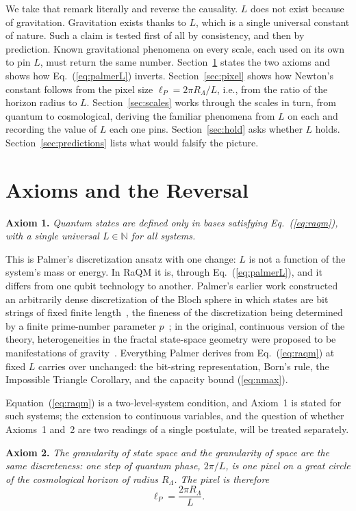 \documentclass[aps,prd,twocolumn,superscriptaddress,nofootinbib,showkeys]{revtex4-2}
\begin{document}
We take that remark literally and reverse the causality. $L$ does not exist because of gravitation. Gravitation exists thanks to $L$, which is a single universal constant of nature. Such a claim is tested first of all by consistency, and then by prediction. Known gravitational phenomena on every scale, each used on its own to pin $L$, must return the same number. Section~\ref{sec:axioms} states the two axioms and shows how Eq.~(\ref{eq:palmerL}) inverts. Section~\ref{sec:pixel} shows how Newton's constant follows from the pixel size $\ell_P = 2\pi R_\Lambda/L$, i.e., from the ratio of the horizon radius to $L$. Section~\ref{sec:scales} works through the scales in turn, from quantum to cosmological, deriving the familiar phenomena from $L$ on each and recording the value of $L$ each one pins. Section~\ref{sec:hold} asks whether $L$ holds. Section~\ref{sec:predictions} lists what would falsify the picture.

\section{Axioms and the Reversal}
\label{sec:axioms}

\textbf{Axiom 1.} \emph{Quantum states are defined only in bases satisfying Eq.~(\ref{eq:raqm}), with a single universal $L\in\mathbb{N}$ for all systems.}

This is Palmer's discretization ansatz with one change: $L$ is not a function of the system's mass or energy. In RaQM it is, through Eq.~(\ref{eq:palmerL}), and it differs from one qubit technology to another. Palmer's earlier work constructed an arbitrarily dense discretization of the Bloch sphere in which states are bit strings of fixed finite length~\cite{palmer2020}, the fineness of the discretization being determined by a finite prime-number parameter $p$~\cite{palmer2022}; in the original, continuous version of the theory, heterogeneities in the fractal state-space geometry were proposed to be manifestations of gravity~\cite{palmer2009}. Everything Palmer derives from Eq.~(\ref{eq:raqm}) at fixed $L$ carries over unchanged: the bit-string representation, Born's rule, the Impossible Triangle Corollary, and the capacity bound (\ref{eq:nmax}).

Equation~(\ref{eq:raqm}) is a two-level-system condition, and Axiom~1 is stated for such systems; the extension to continuous variables, and the question of whether Axioms~1 and~2 are two readings of a single postulate, will be treated separately.

\textbf{Axiom 2.} \emph{The granularity of state space and the granularity of space are the same discreteness: one step of quantum phase, $2\pi/L$, is one pixel on a great circle of the cosmological horizon of radius $R_\Lambda$. The pixel is therefore}
\begin{equation}
\ell_P = \frac{2\pi R_\Lambda}{L} .
\label{eq:ident}
\end{equation}
\end{document}

